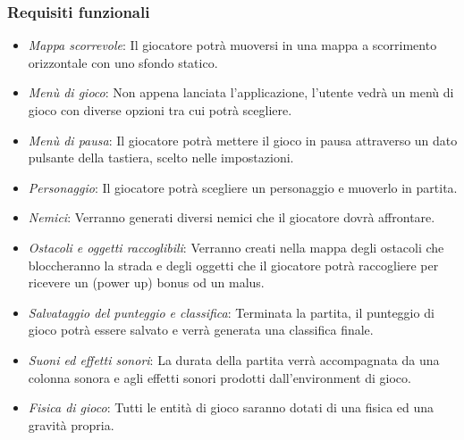 \subsubsection{Requisiti funzionali}

\begin{itemize}
	\item \textsf{\small \emph{Mappa scorrevole}: Il giocatore potrà muoversi in una mappa a scorrimento orizzontale con uno sfondo statico.}
	\item \textsf{\small \emph{Menù di gioco}: Non appena lanciata l'applicazione, l'utente vedrà un menù di gioco con diverse opzioni tra cui potrà scegliere.}
	\item \textsf{\small \emph{Menù di pausa}: Il giocatore potrà mettere il gioco in pausa attraverso un dato pulsante della tastiera, scelto nelle impostazioni.}
	\item \textsf{\small \emph{Personaggio}: Il giocatore potrà scegliere un personaggio e muoverlo in partita.}
	\item \textsf{\small \emph{Nemici}: Verranno generati diversi nemici che il giocatore dovrà affrontare.}
	\item \textsf{\small \emph{Ostacoli e oggetti raccoglibili}: Verranno creati nella mappa degli ostacoli che bloccheranno la strada e degli oggetti che il giocatore potrà raccogliere per ricevere un (power up) bonus od un malus.}
	\item \textsf{\small \emph{Salvataggio del punteggio e classifica}: Terminata la partita, il punteggio di gioco potrà essere salvato e verrà generata una classifica finale.}
	\item \textsf{\small \emph{Suoni ed effetti sonori}: La durata della partita verrà accompagnata da una colonna sonora e agli effetti sonori prodotti dall'environment di gioco.}
	\item \textsf{\small \emph{Fisica di gioco}: Tutti le entità di gioco saranno dotati di una fisica ed una gravità propria.}
\end{itemize}

